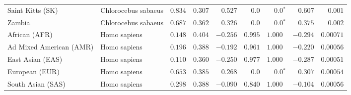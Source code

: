\begin{center}
\begin{adjustbox}{width = 1\textwidth}
\begin{tabular}{|l|l|r|r|r|r|r|r|r|}
            Saint Kitts (SK)                  & Chlorocebus sabaeus        & $ 0.834$ & $ 0.307$ & $ 0.527$ & $0.0$ & $\bm{0.0{^*}}$     & $ 0.607$ & $ 0.001$ \\
            Zambia        & Chlorocebus sabaeus        & $ 0.687$ & $ 0.362$ & $ 0.326$ & $0.0$ & $\bm{0.0{^*}}$ & $ 0.375$ & $ 0.002$ \\
            African (AFR)               & Homo sapiens        & $ 0.148$ & $ 0.404$ & $-0.256$ & $ 0.995$ & $ 1.000~~$     & $-0.294$ & $0.00071$ \\
            Ad Mixed American (AMR)                 & Homo sapiens        & $ 0.196$ & $ 0.388$ & $-0.192$ & $ 0.961$    & $ 1.000~~$ & $-0.220$ & $0.00056$ \\
            East Asian (EAS)              & Homo sapiens        & $ 0.110$ & $ 0.360$ & $-0.250$ & $ 0.977$ & $ 1.000~~$     & $-0.287$ & $0.00051$ \\
            European (EUR)              & Homo sapiens        & $ 0.653$ & $ 0.385$ & $ 0.268$ & $0.0$ & $\bm{0.0{^*}}$     & $ 0.307$ & $0.00054$ \\
            South Asian (SAS)              & Homo sapiens        & $ 0.298$ & $ 0.388$ & $-0.090$ & $ 0.840$ & $ 1.000~~$     & $-0.104$ & $0.00056$ \\
            \bottomrule
        \end{tabular}
    \end{adjustbox}
\end{center}
